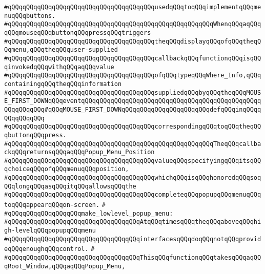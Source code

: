 \verb|#qQQqqQQqqQQqqQQqqQQqqQQqqQQqqQQqqQQqqQQqusedqQQqtoqQQqimplementqQQqmenuqQQqbuttons.|\newline
\verb|#qQQqqQQqqQQqqQQqqQQqqQQqqQQqqQQqqQQqqQQqqQQqqQQqqQQqqQQqWhenqQQqaqQQqqQQqmouseqQQqbuttonqQQqpressqQQqtriggers|\newline
\verb|#qQQqqQQqqQQqqQQqqQQqqQQqqQQqqQQqqQQqqQQqtheqQQqdisplayqQQqofqQQqtheqQQqmenu,qQQqtheqQQquser-supplied|\newline
\verb|#qQQqqQQqqQQqqQQqqQQqqQQqqQQqqQQqqQQqqQQqcallbackqQQqfunctionqQQqisqQQqinvokedqQQqwithqQQqaqQQqvalue|\newline
\verb|#qQQqqQQqqQQqqQQqqQQqqQQqqQQqqQQqqQQqqQQqofqQQqtypeqQQqWhere_Info,qQQqcontainingqQQqtheqQQqinformation|\newline
\verb|#qQQqqQQqqQQqqQQqqQQqqQQqqQQqqQQqqQQqqQQqsuppliedqQQqbyqQQqtheqQQqMOUSE_FIRST_DOWNqQQqeventqQQqqQQqqQQqqQQqqQQqqQQqqQQqqQQqqQQqqQQqqQQqqQQqqQQqqQQqqQQq#qQQqMOUSE_FIRST_DOWNqQQqqQQqqQQqqQQqqQQqqQQqdefqQQqinqQQqqQQqqQQqqQQq|\newline
\verb|#qQQqqQQqqQQqqQQqqQQqqQQqqQQqqQQqqQQqqQQqcorrespondingqQQqtoqQQqtheqQQqbuttonqQQqpress.|\newline
\verb|#qQQqqQQqqQQqqQQqqQQqqQQqqQQqqQQqqQQqqQQqqQQqqQQqqQQqqQQqTheqQQqcallbackqQQqreturnsqQQqaqQQqPopup_Menu_Position|\newline
\verb|#qQQqqQQqqQQqqQQqqQQqqQQqqQQqqQQqqQQqqQQqvalueqQQqspecifyingqQQqitsqQQqchoiceqQQqofqQQqmenuqQQqposition,|\newline
\verb|#qQQqqQQqqQQqqQQqqQQqqQQqqQQqqQQqqQQqqQQqwhichqQQqisqQQqhonoredqQQqsoqQQqlongqQQqasqQQqitqQQqallowsqQQqthe|\newline
\verb|#qQQqqQQqqQQqqQQqqQQqqQQqqQQqqQQqqQQqqQQqcompleteqQQqpopupqQQqmenuqQQqtoqQQqappearqQQqon-screen.|\newline
\verb|#|\newline
\verb|#qQQqqQQqqQQqqQQqqQQqmake_lowlevel_popup_menu:|\newline
\verb|#qQQqqQQqqQQqqQQqqQQqqQQqqQQqqQQqqQQqAtqQQqtimesqQQqtheqQQqaboveqQQqhigh-levelqQQqpopupqQQqmenu|\newline
\verb|#qQQqqQQqqQQqqQQqqQQqqQQqqQQqqQQqqQQqinterfacesqQQqdoqQQqnotqQQqprovideqQQqenoughqQQqcontrol.|\newline
\verb|#|\newline
\verb|#qQQqqQQqqQQqqQQqqQQqqQQqqQQqqQQqqQQqThisqQQqfunctionqQQqtakesqQQqaqQQqRoot_Window,qQQqaqQQqPopup_Menu,|\newline
